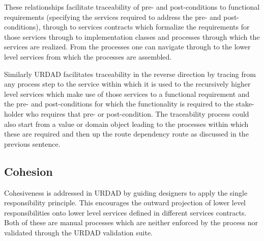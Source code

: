 These relationships facilitate traceability of pre- and post-conditions to functional requirements  (specifying the services required to address the pre- and post-conditions), through to services contracts which formalize the requirements for those services through to implementation classes and  processes through which the services are realized. From the processes one can navigate through to the lower level services from which the processes are assembled.

Similarly URDAD facilitates traceability in the reverse direction by tracing from any process step to the service within which it is used to the recursively higher level services which make use of those services to a functional requirement and the pre- and post-conditions for which the functionality is required to the stake-holder who requires that pre- or post-condition. The traceability process could also start from a value or domain object leading to the processes within which these are required and then up the route dependency route as discussed in the previous sentence.


\subsection{Cohesion}

Cohesiveness \cite{counsell_2006:cohesionMetrics} is addressed in URDAD by guiding designers to apply the single responsibility principle. This encourages the outward projection of  lower level responsibilities onto lower level services defined in different services contracts. Both of these are manual processes which are neither enforced by the process nor validated through the URDAD validation suite.


